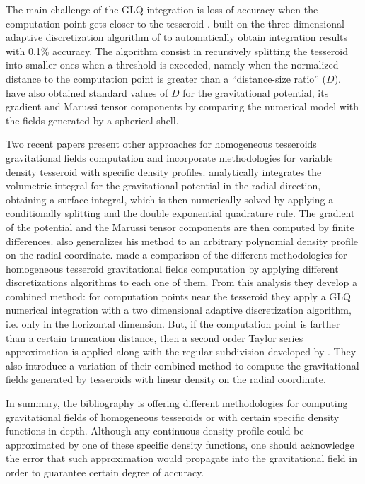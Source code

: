 \documentclass[extra, referee]{gji}
\begin{document}
The main challenge of the GLQ integration is loss of accuracy when the computation point
gets closer to the tesseroid \citep{Ku1977}.
\citet{Uieda2016} built on the three dimensional adaptive discretization algorithm of
\citet{Li2011} to automatically obtain integration results with 0.1\% accuracy.
The algorithm consist in recursively splitting the tesseroid into smaller ones when a
threshold is exceeded,
namely when the normalized distance to the computation point is greater than a
``distance-size ratio'' ($D$).
\citet{Uieda2016} have also obtained standard values of $D$
for the gravitational potential, its gradient and Marussi tensor components
by comparing the numerical model with the fields generated by a spherical shell.

Two recent papers present other approaches for homogeneous tesseroids gravitational
fields computation and incorporate methodologies for variable density tesseroid with
specific density profiles.
\citet{Fukushima2018} analytically integrates the volumetric integral for the
gravitational potential in the radial direction, obtaining a surface integral, which is
then numerically solved by applying a conditionally splitting and the double exponential
quadrature rule. The gradient of the potential and the Marussi tensor components are
then computed by finite differences. \citet{Fukushima2018} also generalizes his method
to an arbitrary polynomial density profile on the radial coordinate.
\citet{Lin2018} made a comparison of the different methodologies for homogeneous
tesseroid gravitational fields computation by applying different discretizations
algorithms to each one of them.
From this analysis they develop a combined method:
for computation points near the tesseroid they apply a GLQ numerical integration with
a two dimensional adaptive discretization algorithm, i.e. only in the horizontal
dimension. But, if the computation point is farther than a certain truncation distance,
then a second order Taylor series approximation is applied along with the regular
subdivision developed by \citet{Grombein2013}.
They also introduce a variation of their combined method to compute the gravitational
fields generated by tesseroids with linear density on the radial coordinate.

In summary, the bibliography is offering different methodologies for computing
gravitational fields of homogeneous tesseroids or with certain specific density
functions in depth.
Although any continuous density profile could be approximated by one of these specific
density functions, one should acknowledge the error that such approximation would
propagate into the gravitational field in order to guarantee certain degree of accuracy.
\end{document}
